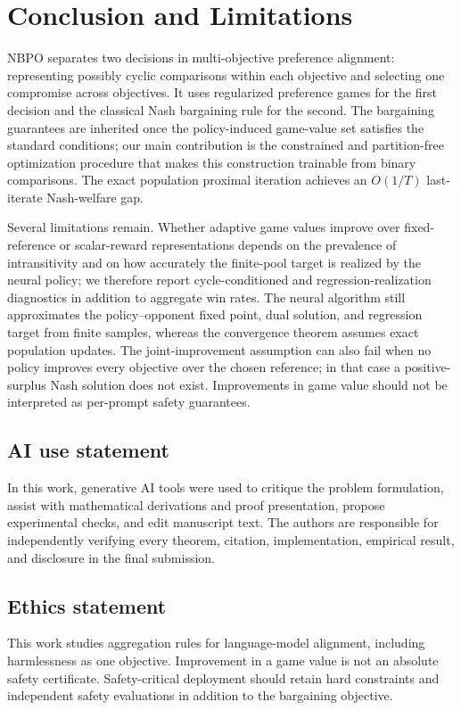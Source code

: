 \documentclass{article}
\theoremstyle{remark}
\theoremstyle{plain}
\newcommand{\NBPO}{\textsc{NBPO}}
\begin{document}
\section{Conclusion and Limitations}
\label{sec:conclusion}
\NBPO{} separates two decisions in multi-objective preference alignment: representing possibly cyclic comparisons within each objective and selecting one compromise across objectives. It uses regularized preference games for the first decision and the classical Nash bargaining rule for the second. The bargaining guarantees are inherited once the policy-induced game-value set satisfies the standard conditions; our main contribution is the constrained and partition-free optimization procedure that makes this construction trainable from binary comparisons. The exact population proximal iteration achieves an $O(1/T)$ last-iterate Nash-welfare gap.

Several limitations remain. Whether adaptive game values improve over fixed-reference or scalar-reward representations depends on the prevalence of intransitivity and on how accurately the finite-pool target is realized by the neural policy; we therefore report cycle-conditioned and regression-realization diagnostics in addition to aggregate win rates. The neural algorithm still approximates the policy--opponent fixed point, dual solution, and regression target from finite samples, whereas the convergence theorem assumes exact population updates. The joint-improvement assumption can also fail when no policy improves every objective over the chosen reference; in that case a positive-surplus Nash solution does not exist. Improvements in game value should not be interpreted as per-prompt safety guarantees.

\subsection*{AI use statement}
In this work, generative AI tools were used to critique the problem formulation, assist with mathematical derivations and proof presentation, propose experimental checks, and edit manuscript text. The authors are responsible for independently verifying every theorem, citation, implementation, empirical result, and disclosure in the final submission.

\subsection*{Ethics statement}
This work studies aggregation rules for language-model alignment, including harmlessness as one objective. Improvement in a game value is not an absolute safety certificate. Safety-critical deployment should retain hard constraints and independent safety evaluations in addition to the bargaining objective.
\end{document}
